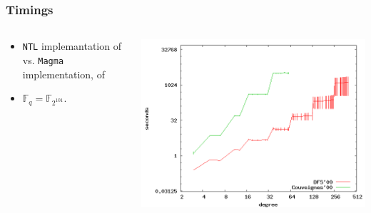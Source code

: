 \documentclass[10pt]{beamer}
\newcommand{\F}{\mathbb{F}}  %
\newcommand{\0}{\mathcal{O}}  %
\begin{document}

\begin{frame}
  \frametitle{Timings}

  
  \begin{columns}
    \begin{column}{0.4\textwidth}
      \begin{itemize}
      \item \texttt{NTL} implemantation of \cite{DFS09} vs.  \texttt{Magma}
        implementation, of \cite{Couveignes00}
      \item $\F_q = \F_{2^{101}}$.
      \end{itemize}
    \end{column}
    \begin{column}{0.6\textwidth}
             {\includegraphics[width=\textwidth]{2-101}}


\end{column}
\end{columns}
\end{frame}
\end{document}
